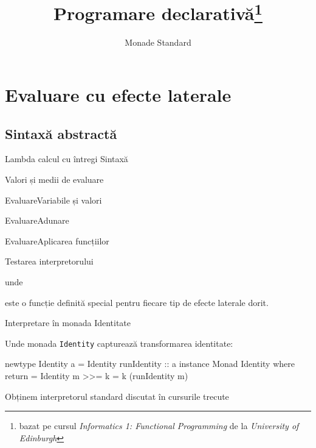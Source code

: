 \documentclass[xcolor=pdftex,romanian,colorlinks]{beamer}
\title[PD---Monade]{Programare declarativă\thanks{bazat pe cursul \emph{Informatics 1: Functional Programming} de la \emph{University of Edinburgh}}}
\subtitle{Monade Standard}
\begin{document}
\begin{frame}
  \titlepage
\end{frame}

\section{Evaluare cu efecte laterale}

\subsection{Sintaxă abstractă}

\begin{frame}[fragile]{Lambda calcul cu întregi}
{Sintaxă}

\end{frame}


\begin{frame}[fragile]
{Valori și medii de evaluare}

\end{frame}

\begin{frame}[fragile]
{Evaluare}{Variabile și valori}

\end{frame}

\begin{frame}[fragile]
{Evaluare}{Adunare}

\end{frame}

\begin{frame}[fragile]
{Evaluare}{Aplicarea funcțiilor}

\end{frame}

\begin{frame}[fragile]{Testarea interpretorului}


unde



este o funcție definită special pentru fiecare tip de efecte laterale dorit.
\end{frame}

\begin{frame}[fragile]{Interpretare în monada Identitate}


Unde monada \lstinline$Identity$ capturează transformarea identitate:

\begin{asciihs}
newtype Identity a = Identity { runIdentity :: a }
instance Monad Identity where
    return   = Identity
    m >>= k  = k (runIdentity m)
\end{asciihs}
 Obținem interpretorul standard discutat în cursurile trecute
\end{frame}
\end{document}
